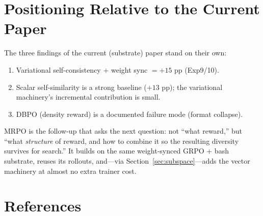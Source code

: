 \documentclass[11pt,a4paper]{article}
\begin{document}
\section{Positioning Relative to the Current Paper}
\label{sec:positioning}

The three findings of the current (substrate) paper stand on their own:
\begin{enumerate}[nosep]
\item Variational self-consistency + weight sync $=+15$ pp (Exp9/10).
\item Scalar self-similarity is a strong baseline ($+13$ pp); the
  variational machinery's incremental contribution is small.
\item DBPO (density reward) is a documented failure mode (format collapse).
\end{enumerate}
MRPO is the follow-up that asks the next question: not ``what reward,'' but
``what \emph{structure} of reward, and how to combine it so the resulting
diversity survives for search.''  It builds on the same weight-synced GRPO +
bash substrate, reuses its rollouts, and---via
Section~\ref{sec:subspace}---adds the vector machinery at almost no extra
trainer cost.

\section*{References}
\end{document}
